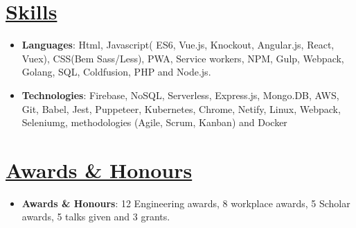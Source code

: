 \documentclass[letterpaper,11pt]{article}
\newcommand{\resumeItem}[2]{
  \item\small{
    \textbf{#1}{: #2 \vspace{-2pt}}
  }
}
\newcommand{\resumeSubItem}[2]{\resumeItem{#1}{#2}\vspace{-4pt}}
\newcommand{\resumeSubHeadingListStart}{\begin{itemize}[leftmargin=*]}
\newcommand{\resumeSubHeadingListEnd}{\end{itemize}}
\begin{document}
\section{\href{https://robertgabriel.ninja/\#skills}{Skills}}
\resumeSubHeadingListStart
\resumeSubItem{Languages}{Html, Javascript( ES6, Vue.js, Knockout, Angular.js, React, Vuex), CSS(Bem Sass/Less), PWA, Service workers, NPM, Gulp, Webpack, Golang, SQL, Coldfusion, PHP and Node.js.}

\resumeSubItem{Technologies}{Firebase, NoSQL, Serverless, Express.js, Mongo.DB, AWS, Git, Babel, Jest, Puppeteer, Kubernetes, Chrome, Netify,  Linux, Webpack, Seleniumg, methodologies (Agile,
Scrum, Kanban) and Docker}
\resumeSubHeadingListEnd


\section{\href{https://robertgabriel.ninja/awards}{Awards \& Honours}}
\resumeSubHeadingListStart
\resumeSubItem{Awards \& Honours}{12 Engineering awards, 8 workplace awards, 5 Scholar awards, 5 talks given and 3 grants.}

\resumeSubHeadingListEnd


\end{document}
